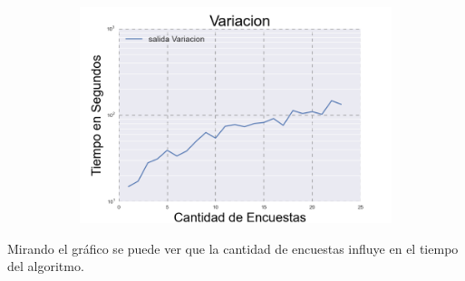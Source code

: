 \begin{figure}[h]
\begin{subfigure}{0.5\textwidth}
\includegraphics[scale=0.45]{VariacionEncuestas.png}
\end{subfigure}
\end{figure}

	Mirando el gráfico se puede ver que la cantidad de encuestas influye en el tiempo del algoritmo.

